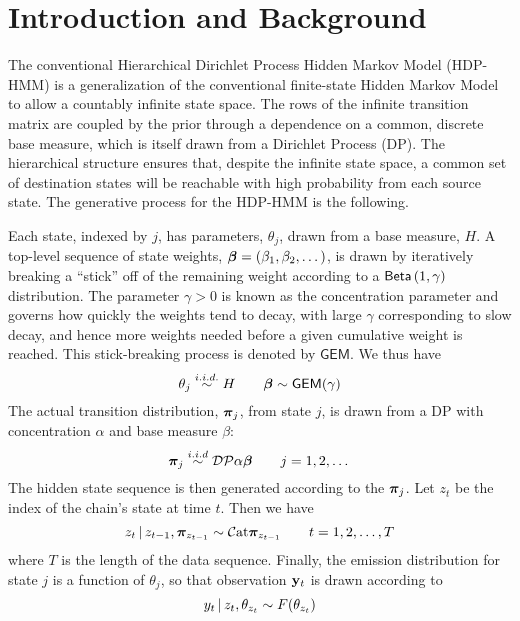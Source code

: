 \section{Introduction and Background}

The conventional Hierarchical Dirichlet Process Hidden Markov Model
(HDP-HMM) \cite{beal2001infinite, teh2006hierarchical} 
is a generalization of the conventional finite-state Hidden Markov
Model to allow a countably infinite state space.  The rows of the
infinite transition matrix are coupled by the prior 
through a dependence on a common, discrete base measure,
which is itself drawn from a Dirichlet Process (DP).
The hierarchical structure ensures that, despite the infinite state
space, a common set of destination states will be reachable with high probability
from each source state.  The generative process for the HDP-HMM is the following.

Each state, indexed by $j$, has parameters,
$\theta_j$, drawn from a base measure, $H$.  A top-level
sequence of state weights, $\boldsymbol{\beta} = (\beta_1, \beta_2, \dots)$, is
drawn by iteratively breaking a ``stick'' off of the remaining weight
according to a $\mathsf{Beta}\left(1,\gamma\right)$ distribution.
The parameter $\gamma > 0$ is known as the concentration parameter and
governs how quickly the weights tend to decay, with 
large $\gamma$ corresponding to slow decay,
and hence more weights needed before a given cumulative weight is
reached.  This stick-breaking process is denoted by $\mathsf{GEM}$.
We thus have
\begin{equation}
\theta_j \stackrel{i.i.d.}{\sim} H \qquad \boldsymbol{\beta} \sim \mathsf{GEM}(\gamma)
\end{equation}
The actual transition distribution, $\boldsymbol{\pi}_j$, from state $j$,
is drawn from a DP with concentration $\alpha$ and base measure $\beta$:
\begin{equation}
  \label{eq:1}
  \boldsymbol{\pi}_j \stackrel{i.i.d}{\sim} \mathcal{DP}{\alpha \boldsymbol{\beta}} \qquad j = 1, 2, \dots
\end{equation}
The hidden state sequence is then generated according to the $\boldsymbol{\pi}_j$.
Let $z_t$ be the index of the chain's state at time $t$.  Then we have
\begin{equation}
  \label{eq:4}
  z_t \, \vert \, z_{t-1}, \boldsymbol{\pi}_{z_{t-1}} \sim \mathcal{C}\mathrm{at}{\boldsymbol{\pi}_{z_{t-1}}} \qquad t = 1, 2, \dots, T
\end{equation}
where $T$ is the length of the data sequence.  Finally, the emission distribution 
for state $j$ is a function of $\theta_j$, so that observation
$\mathbf{y}_t$ is drawn according to
\begin{equation}
  \label{eq:5}
  y_t \, \vert \, z_{t}, \theta_{z_t} \sim F(\theta_{z_t})
\end{equation}

